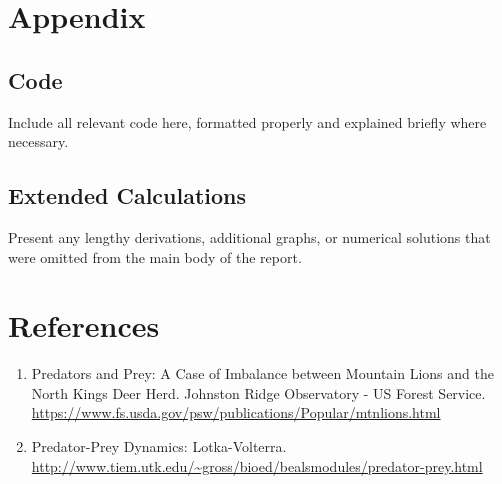 \documentclass[12pt]{article}
\begin{document}
\section*{Appendix}
\subsection*{Code}
Include all relevant code here, formatted properly and explained briefly where necessary.

\subsection*{Extended Calculations}
Present any lengthy derivations, additional graphs, or numerical solutions that were omitted from the main body of the report.

\section*{References}
\begin{enumerate}
    \item Predators and Prey: A Case of Imbalance between Mountain Lions and the North Kings Deer Herd. Johnston Ridge Observatory - US Forest Service. \\ \url{https://www.fs.usda.gov/psw/publications/Popular/mtnlions.html}
    \item Predator-Prey Dynamics: Lotka-Volterra. \\ \url{http://www.tiem.utk.edu/~gross/bioed/bealsmodules/predator-prey.html}
\end{enumerate}
\end{document}
